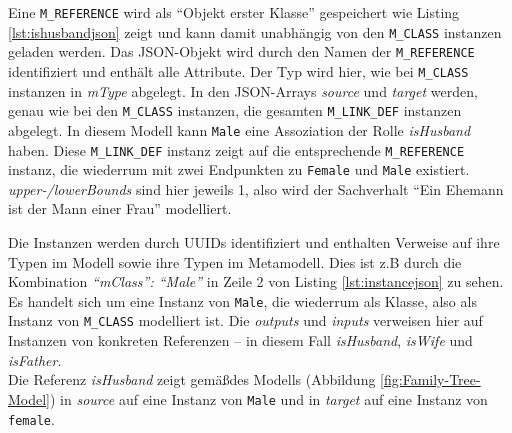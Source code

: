 

Eine \texttt{M\_REFERENCE} wird als "`Objekt erster Klasse"' gespeichert wie Listing \ref{lst:ishusbandjson} zeigt und kann damit unabhängig von den \texttt{M\_CLASS} instanzen geladen werden. Das JSON-Objekt wird durch den Namen der \texttt{M\_REFERENCE} identifiziert und enth\"alt alle Attribute. Der Typ wird hier, wie bei \texttt{M\_CLASS} instanzen in \textit{mType} abgelegt. In den JSON-Arrays \textit{source} und \textit{target} werden, genau wie bei den \texttt{M\_CLASS} instanzen, die gesamten \texttt{M\_LINK\_DEF} instanzen abgelegt. In diesem Modell kann \texttt{Male} eine Assoziation der Rolle \textit{isHusband} haben. Diese \texttt{M\_LINK\_DEF} instanz zeigt auf die entsprechende \texttt{M\_REFERENCE} instanz, die wiederrum mit zwei Endpunkten zu \texttt{Female} und \texttt{Male} existiert. \textit{upper-/lowerBounds} sind hier jeweils 1, also wird der Sachverhalt "`Ein Ehemann ist der Mann einer Frau"' modelliert.



Die Instanzen werden durch UUIDs identifiziert und enthalten Verweise auf ihre Typen im Modell sowie ihre Typen im Metamodell. Dies ist z.B durch die Kombination \textit{"`mClass"': "`Male"'} in Zeile 2 von Listing \ref{lst:instancejson} zu sehen. Es handelt sich um eine Instanz von \texttt{Male}, die wiederrum als Klasse, also als Instanz von \texttt{M\_CLASS} modelliert ist. Die \textit{outputs} und \textit{inputs} verweisen hier auf Instanzen von konkreten Referenzen -- in diesem Fall \textit{isHusband}, \textit{isWife} und \textit{isFather}.\\
Die Referenz \textit{isHusband} zeigt gem\"a\ss des Modells (Abbildung \ref{fig:Family-Tree-Model}) in \textit{source} auf eine Instanz von \texttt{Male} und in \textit{target} auf eine Instanz von \texttt{female}.



